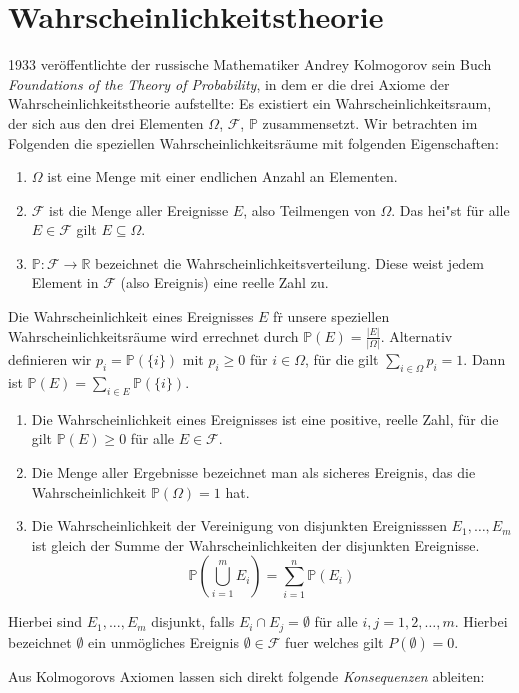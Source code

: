 \newcommand{\Var}{\operatorname{Var}}

\section{Wahrscheinlichkeitstheorie}
1933 ver\"offentlichte der russische Mathematiker Andrey Kolmogorov sein Buch \textit{Foundations of the Theory of Probability}, in dem er die drei Axiome der Wahrscheinlichkeitstheorie aufstellte: Es existiert ein Wahrscheinlichkeitsraum, der sich aus den drei Elementen $\Omega$, $\mathcal{F}$, $\mathbb{P}$ zusammensetzt. Wir betrachten im Folgenden die speziellen Wahrscheinlichkeitsr\"aume mit folgenden Eigenschaften:

\begin{enumerate}
	\item $\Omega$ ist eine Menge mit einer endlichen Anzahl an Elementen.
	\item $\mathcal{F}$ ist die Menge aller Ereignisse $E$, also Teilmengen von $\Omega$. Das hei"st f\"ur alle $E \in \mathcal{F}$ gilt $E \subseteq \Omega$.
	\item $\mathbb{P}: \mathcal{F} \rightarrow \mathbb{R}$ bezeichnet die Wahrscheinlichkeitsverteilung. Diese weist jedem Element in $\mathcal{F}$ (also Ereignis) eine reelle Zahl zu.  
\end{enumerate}
\medskip

Die Wahrscheinlichkeit eines Ereignisses $E$ f\"r unsere speziellen Wahrscheinlichkeitsr\"aume wird errechnet durch $ \mathbb{P}(E) = \frac{|E|}{|\Omega|}$.
Alternativ definieren wir $p_{i} = \mathbb{P} (\{i\})$ mit $p_{i} \geq 0$  
f\"ur $i \in \Omega$, f\"ur die gilt $\sum_{i\in \Omega} p_{i} =1$. Dann ist $\mathbb{P}(E) = \sum_{i\in E} \mathbb{P}(\{i\})$. 


\begin{Def}
\medskip
\begin{enumerate}
	\item Die Wahrscheinlichkeit eines Ereignisses ist eine positive, reelle Zahl, f\"ur die gilt $\mathbb{P} (E) \geq 0$ f\"ur alle $E \in \mathcal{F}$.
	\item Die Menge aller Ergebnisse bezeichnet man als sicheres Ereignis, das die Wahrscheinlichkeit $\mathbb{P} (\Omega) = 1$ hat.
	\item Die Wahrscheinlichkeit der Vereinigung von disjunkten Ereignisssen $E_1, \dots, E_m$ ist gleich der Summe der Wahrscheinlichkeiten der disjunkten Ereignisse. 
	\vspace{3pt}
	\begin{equation*}
	\mathbb{P} \left(\bigcup_{i=1}^m E_{i}\right) = \sum_{i=1}^n \mathbb{P} (E_{i})
	\end{equation*}
\end{enumerate}
Hierbei sind $E_{1},...,E_{m}$ disjunkt, falls $E_{i} \cap E_{j} = \emptyset$ f\"ur alle $i,j= 1,2,\dots,m$. 
Hierbei bezeichnet $\emptyset$ ein unm\"ogliches Ereignis $\emptyset \in \mathcal{F}$ fuer welches gilt $P(\emptyset) = 0$.
\end{Def}
Aus Kolmogorovs Axiomen lassen sich direkt folgende \textit{Konsequenzen} ableiten:

